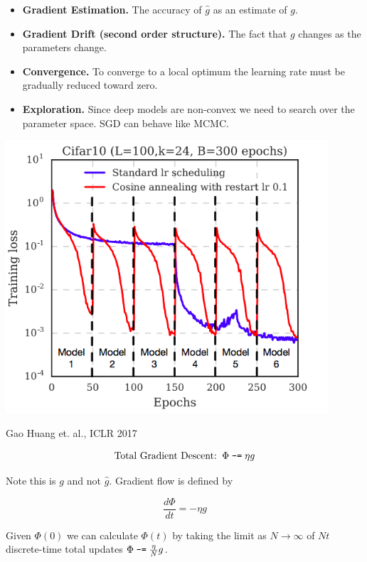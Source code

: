 {\vfill
\begin{itemize}
\item {\bf Gradient Estimation.} The accuracy of $\hat{g}$ as an estimate of $g$.

  \vfill
\item {\bf Gradient Drift (second order structure).} The fact that $g$ changes as the parameters change.

  \vfill
\item {\bf Convergence.} To converge to a local optimum the learning rate must be gradually reduced toward zero.

  \vfill
  \item {\bf Exploration.} Since deep models are non-convex we need to search over the parameter space.  SGD can behave like MCMC.
\end{itemize}


\centerline{\includegraphics[height= 4in]{../images/AnnealingSGD}}
\centerline{\Large Gao Huang et. al., ICLR 2017}



$$\mbox{Total Gradient Descent:} \;\;\Phi \;\mbox{\tt -=}\; \eta g$$

\vfill
Note this is $g$ and not $\hat{g}$. Gradient flow is defined by

\vfill
$$\frac{d \Phi}{d t} = - \eta g$$

\vfill
Given $\Phi(0)$ we can calculate $\Phi(t)$ by taking the limit as $N \rightarrow \infty$ of $Nt$ discrete-time total updates
$\Phi\; \mbox{\tt -=} \; \frac{\eta}{N} g$.


}
